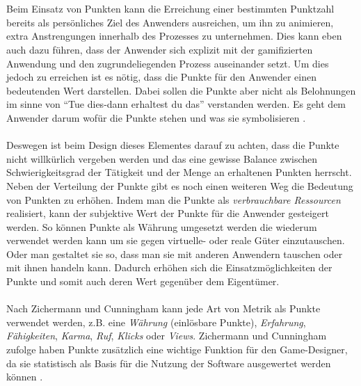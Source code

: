 \documentclass[a4paper,12pt,twoside]{scrartcl}
\begin{document}
\\\\
Beim Einsatz von Punkten kann die Erreichung einer bestimmten Punktzahl bereits als persönliches Ziel des Anwenders ausreichen, um ihn zu animieren, extra Anstrengungen innerhalb des Prozesses zu unternehmen. Dies kann eben auch dazu führen, dass der Anwender sich explizit mit der gamifizierten Anwendung und den zugrundeliegenden Prozess auseinander setzt. Um dies jedoch zu erreichen ist es nötig, dass die Punkte für den Anwender einen bedeutenden Wert darstellen. Dabei sollen die Punkte aber nicht als Belohnungen im sinne von \enquote{Tue dies-dann erhaltest du das} verstanden werden. Es geht dem Anwender darum wofür die Punkte stehen und was sie symbolisieren \cite{gamificationDefinition}.     
\\\\  
Deswegen ist beim Design dieses Elementes darauf zu achten, dass die Punkte nicht willkürlich vergeben werden und das eine gewisse Balance zwischen Schwierigkeitsgrad der Tätigkeit und der Menge an erhaltenen Punkten herrscht. Neben der Verteilung der Punkte gibt es noch einen weiteren Weg die Bedeutung von Punkten zu erhöhen. Indem man die Punkte als \textit{verbrauchbare Ressourcen} realisiert, kann der subjektive Wert der Punkte für die Anwender gesteigert werden. So können Punkte als Währung umgesetzt werden die wiederum verwendet werden kann um sie gegen virtuelle- oder reale Güter einzutauschen. Oder man gestaltet sie so, dass man sie mit anderen Anwendern tauschen oder mit ihnen handeln kann. Dadurch erhöhen sich die Einsatzmöglichkeiten der Punkte und somit auch deren Wert gegenüber dem Eigentümer. 
\\\\
Nach Zichermann und Cunningham \cite{Zichermann2011} kann jede Art von Metrik als Punkte verwendet werden, z.B. eine \textit{Währung} (einlösbare Punkte), \textit{Erfahrung}, \textit{Fähigkeiten}, \textit{Karma}, \textit{Ruf}, \textit{Klicks} oder \textit{Views}. Zichermann und Cunningham zufolge haben Punkte zusätzlich eine wichtige Funktion für den Game-Designer, da sie statistisch als Basis für die Nutzung der Software ausgewertet werden können \cite{Zichermann2011}.
\end{document}
